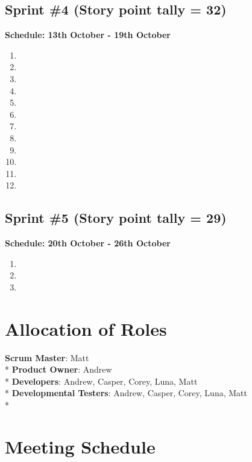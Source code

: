 \documentclass[12pt,titlepage]{article}
\begin{document}
\subsection{Sprint \#4 (Story point tally = 32)}
\textbf{Schedule: 13th October - 19th October}
\begin{enumerate}
   \item \storyFivePointFive{}
   \item \storyNinePointOne{}
   \item \storyNinePointThree{}
   \item \storyNinePointFour{}
   \item \storyTenPointOne{}
   \item \storyTwelvePointOne{}
   \item \storyTwelvePointTwo{}
   \item \storyTwelvePointThree{}
   \item \storyTwelvePointFour{}
   \item \storySixPointOne{}
   \item \storySixPointTwo{}
   \item \storyFivePointSeven{}
\end{enumerate}

\subsection{Sprint \#5 (Story point tally = 29)}
\textbf{Schedule: 20th October - 26th October}
\begin{enumerate}
   \item \storyFivePointSix{}
   \item \storyElevenPointSix{}
   \item \storyThirteenPointOne{}
\end{enumerate}

\section{Allocation of Roles}

\textbf{Scrum Master}: Matt \\*
\textbf{Product Owner}: Andrew \\*
\textbf{Developers}: Andrew, Casper, Corey, Luna, Matt \\*
\textbf{Developmental Testers}: Andrew, Casper, Corey, Luna, Matt \\*

\section{Meeting Schedule}
\end{document}
